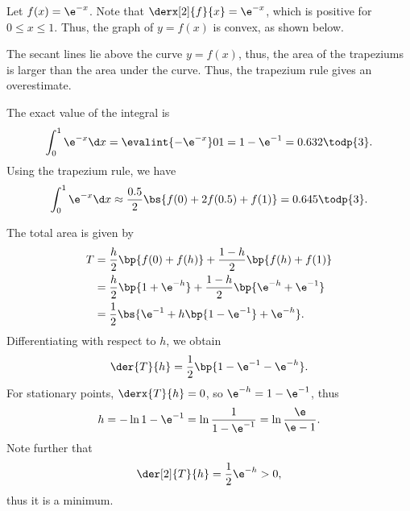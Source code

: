 \begin{solution}
    Let $f(x) = \e^{-x}$. Note that $\derx[2]{f}{x} = \e^{-x}$, which is positive for $0 \leq x \leq 1$. Thus, the graph of $y = f(x)$ is convex, as shown below.

    \begin{figure}[H]
        \centering
    \end{figure}

    The secant lines lie above the curve $y = f(x)$, thus, the area of the trapeziums is larger than the area under the curve. Thus, the trapezium rule gives an overestimate.

    The exact value of the integral is \[\int_0^1 \e^{-x} \d x = \evalint{-\e^{-x}}01 = 1 - \e^{-1} = 0.632 \todp{3}.\] Using the trapezium rule, we have \[\int_0^1 \e^{-x} \d x \approx \frac{0.5}{2} \bs{f(0) + 2f(0.5) + f(1)} = 0.645 \todp{3}.\]

    The total area is given by
    \begin{align*}
        T &= \frac{h}{2} \bp{f(0) + f(h)} + \frac{1-h}{2} \bp{f(h) + f(1)}\\
        &= \frac{h}2 \bp{1 + \e^{-h}} + \frac{1-h}{2} \bp{\e^{-h} + \e^{-1}}\\
        &= \frac12 \bs{\e^{-1} + h\bp{1 - \e^{-1}} + \e^{-h}}.
    \end{align*}
    Differentiating with respect to $h$, we obtain \[\der{T}{h} = \frac12 \bp{1 - \e^{-1} - \e^{-h}}.\] For stationary points, $\derx{T}{h} = 0$, so $\e^{-h} = 1 - \e^{-1}$, thus \[h = -\ln{1 - \e^{-1}} = \ln \frac1{1 - \e^{-1}} = \ln \frac{\e}{\e - 1}.\] Note further that \[\der[2]{T}{h} = \frac12 \e^{-h} > 0,\] thus it is a minimum.
\end{solution}


